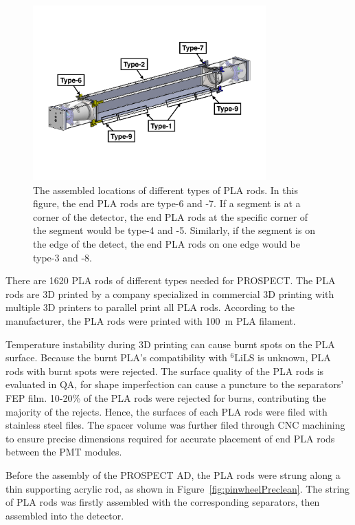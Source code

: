 \begin{figure}[h!]
\centering
\includegraphics[trim = 0cm 5cm 0cm 5cm, clip,width=0.8\textwidth]{Figures/PinwheelLocation.pdf}
\caption[Assembled location of PLA rods]{The assembled locations of different types of PLA rods. In this figure, the end PLA rods are type-6 and -7. If a segment is at a corner of the detector, the end PLA rods at the specific corner of the segment would be type-4 and -5. Similarly, if the segment is on the edge of the detect, the end PLA rods on one edge would be type-3 and -8.}
\label{fig:pinwheelloc}
\end{figure}

There are 1620 PLA rods of different types needed for PROSPECT.
The PLA rods are 3D printed by a company specialized in commercial 3D printing with multiple 3D printers to parallel print all PLA rods.
According to the manufacturer, the PLA rods were printed with 100~\textmu m PLA filament.

Temperature instability during 3D printing can cause burnt spots on the PLA surface. 
Because the burnt PLA's compatibility with $^6$LiLS is unknown, PLA rods with burnt spots were rejected.
The surface quality of the PLA rods is evaluated in QA, for shape imperfection can cause a puncture to the separators' FEP film.
10-20\% of the PLA rods were rejected for burns, contributing the majority of the rejects. 
Hence, the surfaces of each PLA rods were filed with stainless steel files.  
The spacer volume was further filed through CNC machining to ensure precise dimensions required for accurate placement of end PLA rods between the PMT modules.

Before the assembly of the PROSPECT AD, the PLA rods were strung along a thin supporting acrylic rod, as shown in Figure~\ref{fig:pinwheelPreclean}.
The string of PLA rods was firstly assembled with the corresponding separators, then assembled into the detector.

